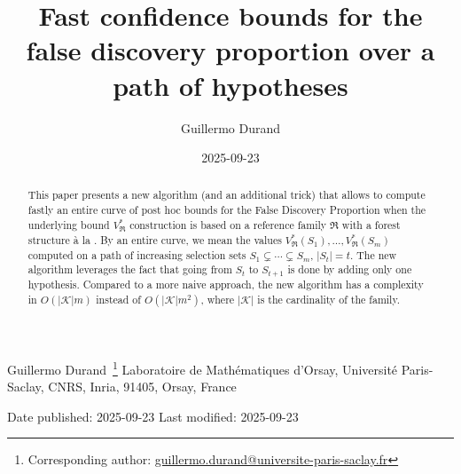 \documentclass[
  11pt,
  a4paper,
]{article}
\title{Fast confidence bounds for the false discovery proportion over a
path of hypotheses}
\author{Guillermo Durand}
\date{2025-09-23}
\theoremstyle{plain}
\theoremstyle{definition}
\theoremstyle{plain}
\theoremstyle{definition}
\theoremstyle{plain}
\theoremstyle{remark}
\begin{document}


\vspace*{2.5cm}
\begin{center}
          Guillermo
Durand~\footnote{Corresponding author: \href{mailto:guillermo.durand@universite-paris-saclay.fr}{guillermo.durand@universite-paris-saclay.fr}}\quad
             Laboratoire de Mathématiques d'Orsay, Université
Paris-Saclay, CNRS, Inria, 91405, Orsay, France\\
           
  \bigskip
  
  Date published: 2025-09-23 \quad Last modified: 2025-09-23
\end{center}
      
\bigskip
\begin{abstract}
This paper presents a new algorithm (and an additional trick) that
allows to compute fastly an entire curve of post hoc bounds for the
False Discovery Proportion when the underlying bound
\(V^*_{\mathfrak{R}}\) construction is based on a reference family
\(\mathfrak{R}\) with a forest structure à la \citet{MR4178188}. By an
entire curve, we mean the values
\(V^*_{\mathfrak{R}}(S_1),\dotsc,V^*_{\mathfrak{R}}(S_m)\) computed on a
path of increasing selection sets \(S_1\subsetneq\dotsb\subsetneq S_m\),
\(|S_t|=t\). The new algorithm leverages the fact that going from
\(S_t\) to \(S_{t+1}\) is done by adding only one hypothesis. Compared
to a more naive approach, the new algorithm has a complexity in
\(O(|\mathcal K|m)\) instead of \(O(|\mathcal K|m^2)\), where
\(|\mathcal K|\) is the cardinality of the family.
\end{abstract}
\end{document}
